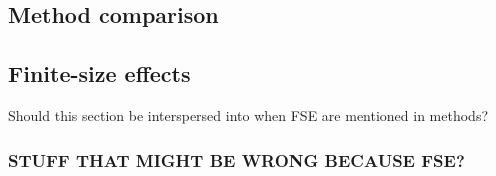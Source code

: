 \subsection{Method comparison}

\subsection{Finite-size effects}
Should this section be interspersed into when FSE are mentioned in methods?

\subsubsection{STUFF THAT MIGHT BE WRONG BECAUSE FSE?}


